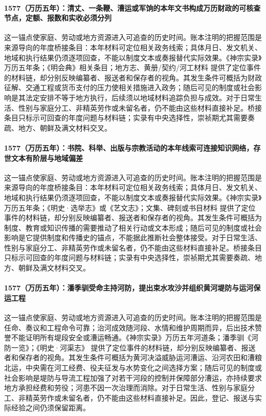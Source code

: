 \paragraph{1577（万历五年）：清丈、一条鞭、漕运或军饷的本年文书构成万历财政的可核查节点，定额、报数和实收必须分列} 这一锚点使家庭、劳动或地方资源进入可追查的历史时间。账本注明的把握范围是来源导向的年度桥接条目：本年材料可定位相关政务线索；具体月日、发文机关、地域和执行结果仍须逐项回查，不能以制度文本或奏报替代实际效果。《神宗实录》万历五年条；《明会典》相关条目；地方志、黄册/契约/河工材料 提供了定位事件的材料链，却分别反映编纂者、报送者和保存者的视角。其发生条件可概括为财政征解、交通工程或货币支付的压力使相关措施进入政务；随后可见的制度或社会影响是其法定安排不等于地方执行，后续须以地域材料追踪负担与成效。对于日常生活、性别与家庭分工、非精英劳作或未留名者，仍不能由这些材料直接补足。桥接条目只标示可回查的年度问题与材料链；实录有中央选择性，崇祯期尤其需要奏疏、地方、朝鲜及满文材料交叉。

\paragraph{1577（万历五年）：书院、科举、出版与宗教活动的本年线索可连接知识网络，存世文本有阶层与地域偏差} 这一锚点使家庭、劳动或地方资源进入可追查的历史时间。账本注明的把握范围是来源导向的年度桥接条目：本年材料可定位相关政务线索；具体月日、发文机关、地域和执行结果仍须逐项回查，不能以制度文本或奏报替代实际效果。《神宗实录》万历五年条；《明史·选举志》或《艺文志》；文集、碑刻或书目材料 提供了定位事件的材料链，却分别反映编纂者、报送者和保存者的视角。其发生条件可概括为制度、教育或知识传播的需要推动了相关行动或文本形成；随后可见的制度或社会影响是它提供制度和传播史的锚点，不能据此推断社会整体接受。对于日常生活、性别与家庭分工、非精英劳作或未留名者，仍不能由这些材料直接补足。桥接条目只标示可回查的年度问题与材料链；实录有中央选择性，崇祯期尤其需要奏疏、地方、朝鲜及满文材料交叉。

\paragraph{1577（万历五年）：潘季驯受命主持河防，提出束水攻沙并组织黄河堤防与运河保运工程} 这一锚点使家庭、劳动或地方资源进入可追查的历史时间。账本注明的把握范围是任命、奏议和工程命令可靠；治河成效随河段、水情和维护周期而异，后出技术赞誉不能证明所有堤段安全或漕运畅通。《神宗实录》万历五年河道条；潘季驯《河防一览》；《明史·河渠志》 提供了定位事件的材料链，却分别反映编纂者、报送者和保存者的视角。其发生条件可概括为黄河决溢威胁运河漕运、沿河农田和漕粮北运，中央需在河工经费、役夫征发与水势变化之间选择方案；随后可见的制度或社会影响是堤防与导流工程加强了对若干河段的控制并保障部分漕运，亦持续要求地方承担经费和劳役；河患不因一次治理而消除。对于日常生活、性别与家庭分工、非精英劳作或未留名者，仍不能由这些材料直接补足。因此，登记、报送与实际经验之间仍须保留距离。

